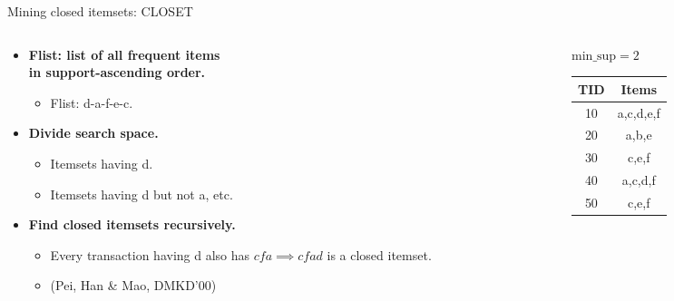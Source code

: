 \documentclass[aspectratio=169,t,xcolor=dvipsnames]{beamer}
\begin{document}
  {
    \begin{frame}{Mining closed itemsets: CLOSET}
      \begin{columns}
        \begin{column}{0.6\textwidth}
        \begin{itemize}
            \item \textbf{Flist: list of all frequent items \\ in support-ascending order.}
            \begin{itemize}
              \item Flist: d-a-f-e-c.
            \end{itemize}
            \item \textbf{Divide search space.}
            \begin{itemize}
              \item Itemsets having d.
              \item Itemsets having d but not a, etc.
            \end{itemize}
            \item \textbf{Find closed itemsets recursively.}
            \begin{itemize}
              \item Every transaction having d also has $cfa \implies cfad$ is a closed itemset.
              \item (Pei, Han \& Mao, DMKD'00)
            \end{itemize}
        \end{itemize}
      \end{column}
      \begin{column}{0.3\textwidth}
        $\text{min\_sup} =2$ \\[0.2cm]
        \begin{tabular}{|c|c|}
          \hline
          TID & Items \\\hline
          10 & a,c,d,e,f \\\hline
          20 & a,b,e \\\hline
          30 & c,e,f \\\hline
          40 & a,c,d,f \\\hline
          50 & c,e,f \\\hline
        \end{tabular}
      \end{column}
      \end{columns}
    \end{frame}
  }
\end{document}
